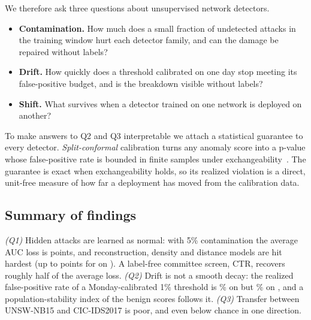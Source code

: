 \documentclass[journal]{IEEEtran}
\begin{document}
We therefore ask three questions about unsupervised network detectors.
\begin{itemize}
\item[\textbf{Q1}] \textbf{Contamination.} How much does a small fraction of undetected attacks in the training window hurt each detector family, and can the damage be repaired without labels?
\item[\textbf{Q2}] \textbf{Drift.} How quickly does a threshold calibrated on one day stop meeting its false-positive budget, and is the breakdown visible without labels?
\item[\textbf{Q3}] \textbf{Shift.} What survives when a detector trained on one network is deployed on another?
\end{itemize}
To make answers to Q2 and Q3 interpretable we attach a statistical guarantee to every detector. \emph{Split-conformal} calibration turns any anomaly score into a p-value whose false-positive rate is bounded in finite samples under exchangeability~\cite{vovk2005,bates2023}. The guarantee is exact when exchangeability holds, so its realized violation is a direct, unit-free measure of how far a deployment has moved from the calibration data.

\subsection*{Summary of findings}
\emph{(Q1)} Hidden attacks are learned as normal: with 5\% contamination the average AUC loss is \meanDropFivePts{} points, and reconstruction, density and distance models are hit hardest (up to \worstDropPts{} points for \worstDropName{} on \worstDropDs). A label-free committee screen, CTR, recovers roughly half of the average loss. \emph{(Q2)} Drift is not a smooth decay: the realized false-positive rate of a Monday-calibrated 1\% threshold is \driftBestFpr\% on \driftBestDay{} but \driftWorstFpr\% on \driftWorstDay, and a population-stability index of the benign scores follows it. \emph{(Q3)} Transfer between UNSW-NB15 and CIC-IDS2017 is poor, and even below chance in one direction.
\end{document}
